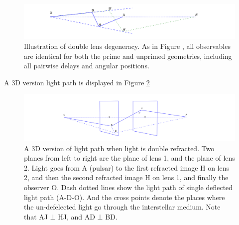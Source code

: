 \documentclass[useAMS,usenatbib]{mn2e}
\begin{document}
\begin{figure}
\centering
\includegraphics[width=1.0\linewidth]{double_degeneracy.png}
\caption{Illustration of double lens degeneracy.  As in
  Figure \protect{\ref{fig:Singledegeneracy}}, all observables are identical
  for both the prime and unprimed geometries, including all pairwise
  delays and angular positions.}
\label{fig:double_degeneracy}
\end{figure}

A 3D version light path is displayed in Figure \ref{fig:3D_image}
\begin{figure}
\centering
\includegraphics[width=1.0\linewidth]{3D_image.png}
\caption{A 3D version of light path when light is double refracted. Two planes from left to right are the plane of lens 1, and the plane of lens 2. Light goes from A (pulsar) to the first refracted image H on lens 2, and then the second refracted image H on lens 1, and finally the observer O. Dash dotted lines show the light path of single deflected light path (A-D-O). And the cross points denote the places where the un-defelected light go through the interstellar medium. Note that AJ $\bot$ HJ, and AD $\bot$ BD.}
\label{fig:3D_image}
\end{figure}
\end{document}
